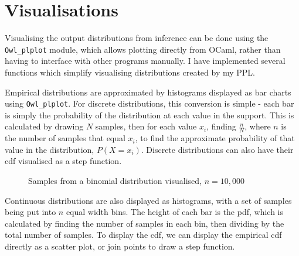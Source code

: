 			
\section{Visualisations}
Visualising the output distributions from inference can be done using the \texttt{Owl\_plplot} module, which allows plotting directly from OCaml, rather than having to interface with other programs manually. I have implemented several functions which simplify visualising distributions created by my PPL. 
				
Empirical distributions are approximated by histograms displayed as bar charts using \texttt{Owl\_plplot}. For discrete distributions, this conversion is simple - each bar is simply the probability of the distribution at each value in the support. This is calculated by drawing $N$ samples, then for each value $x_i$, finding $\frac{n}{N}$, where $n$ is the number of samples that equal $x_i$, to find the approximate probability of that value in the distribution, $P(X = x_i)$. Discrete distributions can also have their cdf visualised as a step function.
			
\begin{figure}[!htb]
	\centering
	\qquad
	\caption{Samples from a binomial distribution visualised, $n=10,000$}
	\label{fig:vis-binom}
\end{figure}
			
Continuous distributions are also displayed as histograms, with a set of samples being put into $n$ equal width bins. The height of each bar is the pdf, which is calculated by finding the number of samples in each bin, then dividing by the total number of samples. To display the cdf, we can display the empirical cdf directly as a scatter plot, or join points to draw a step function.
				
